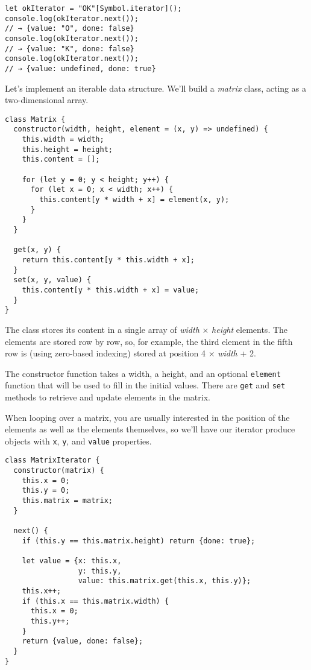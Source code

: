 \begin{lstlisting}
let okIterator = "OK"[Symbol.iterator]();
console.log(okIterator.next());
// → {value: "O", done: false}
console.log(okIterator.next());
// → {value: "K", done: false}
console.log(okIterator.next());
// → {value: undefined, done: true}
\end{lstlisting}
\noindent{}

\label{object.matrix}Let's implement an iterable data structure. We'll build a \emph{matrix} class, acting as a two-dimensional array.

\begin{lstlisting}
class Matrix {
  constructor(width, height, element = (x, y) => undefined) {
    this.width = width;
    this.height = height;
    this.content = [];

    for (let y = 0; y < height; y++) {
      for (let x = 0; x < width; x++) {
        this.content[y * width + x] = element(x, y);
      }
    }
  }

  get(x, y) {
    return this.content[y * this.width + x];
  }
  set(x, y, value) {
    this.content[y * this.width + x] = value;
  }
}
\end{lstlisting}
\noindent

The class stores its content in a single array of \emph{width} × \emph{height} elements. The elements are stored row by row, so, for example, the third element in the fifth row is (using zero-based indexing) stored at position 4 × \emph{width} + 2.

The constructor function takes a width, a height, and an optional \lstinline`element` function that will be used to fill in the initial values. There are \lstinline`get` and \lstinline`set` methods to retrieve and update elements in the matrix.

When looping over a matrix, you are usually interested in the position of the elements as well as the elements themselves, so we'll have our iterator produce objects with \lstinline`x`, \lstinline`y`, and \lstinline`value` properties.

\begin{lstlisting}
class MatrixIterator {
  constructor(matrix) {
    this.x = 0;
    this.y = 0;
    this.matrix = matrix;
  }

  next() {
    if (this.y == this.matrix.height) return {done: true};

    let value = {x: this.x,
                 y: this.y,
                 value: this.matrix.get(this.x, this.y)};
    this.x++;
    if (this.x == this.matrix.width) {
      this.x = 0;
      this.y++;
    }
    return {value, done: false};
  }
}
\end{lstlisting}
\noindent

